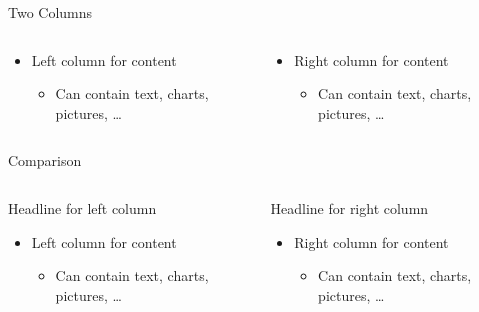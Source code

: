 \documentclass[10pt,compress]{beamer} %
\begin{document}
\begin{frame}[t]{Two Columns} %
\begin{columns}
  \begin{column}{0.5\textwidth}
    \begin{itemize}
	  \item Left column for content
	  \begin{itemize}
	  	\item Can contain text, charts, pictures, … 
		\end{itemize}
	\end{itemize}
  \end{column}
  \begin{column}{0.5\textwidth}  %
    \begin{itemize}
	  \item Right column for content
	  \begin{itemize}
	  	\item Can contain text, charts, pictures, … 
		\end{itemize}
	\end{itemize}
  \end{column}
\end{columns}
\end{frame}


\begin{frame}[t]{Comparison} %
\begin{columns}
  \begin{column}{0.5\textwidth}
  	{\large \textcolor{hellblauMUW}{Headline for left column}}
    \begin{itemize}
	  \item Left column for content
	  \begin{itemize}
	  	\item Can contain text, charts, pictures, … 
		\end{itemize}
	\end{itemize}
  \end{column}
  \begin{column}{0.5\textwidth}  %
  {\large \textcolor{hellblauMUW}{Headline for right column}}
    \begin{itemize}
	  \item Right column for content
	  \begin{itemize}
	  	\item Can contain text, charts, pictures, … 
		\end{itemize}
	\end{itemize}
  \end{column}
\end{columns}
\end{frame}
\end{document}
